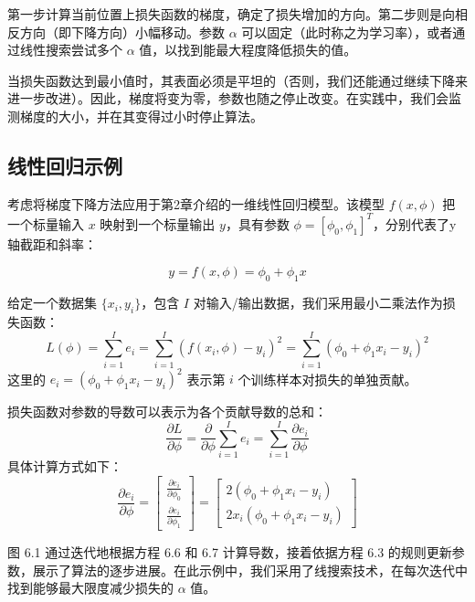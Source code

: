 第一步计算当前位置上损失函数的梯度，确定了损失增加的方向。第二步则是向相反方向（即下降方向）小幅移动。参数 \(\alpha\) 可以固定（此时称之为学习率），或者通过线性搜索尝试多个 \(\alpha\) 值，以找到能最大程度降低损失的值。

当损失函数达到最小值时，其表面必须是平坦的（否则，我们还能通过继续下降来进一步改进）。因此，梯度将变为零，参数也随之停止改变。在实践中，我们会监测梯度的大小，并在其变得过小时停止算法。

\subsection{线性回归示例}

考虑将梯度下降方法应用于第2章介绍的一维线性回归模型。该模型 \(f(x, \phi)\) 把一个标量输入 \(x\) 映射到一个标量输出 \(y\)，具有参数 \(\phi = [\phi_0, \phi_1]^T\)，分别代表了y轴截距和斜率：

\begin{equation}
y = f(x, \phi) = \phi_0 + \phi_1x 
\end{equation}

给定一个数据集 \(\{x_i, y_i\}\)，包含 \(I\) 对输入/输出数据，我们采用最小二乘法作为损失函数：
\begin{equation}
L(\phi) = \sum_{i=1}^I e_i = \sum_{i=1}^I (f(x_i, \phi) - y_i)^2 = \sum_{i=1}^I (\phi_0 + \phi_1x_i - y_i)^2 
\end{equation}
这里的 \(e_i = (\phi_0 + \phi_1x_i - y_i)^2\) 表示第 \(i\) 个训练样本对损失的单独贡献。

损失函数对参数的导数可以表示为各个贡献导数的总和：
\begin{equation}
\frac{\partial L}{\partial \phi} = \frac{\partial}{\partial \phi} \sum_{i=1}^I e_i = \sum_{i=1}^I \frac{\partial e_i}{\partial \phi} 
\end{equation}
具体计算方式如下：
\begin{equation}
\frac{\partial e_i}{\partial \phi} = 
\begin{bmatrix}
\frac{\partial e_i}{\partial \phi_0}  \\
\frac{\partial e_i}{\partial \phi_1} 
\end{bmatrix} =
\begin{bmatrix}
2(\phi_0 + \phi_1x_i - y_i)  \\
2x_i(\phi_0 + \phi_1x_i - y_i)  
\end{bmatrix} 
\end{equation}

图 6.1 通过迭代地根据方程 6.6 和 6.7 计算导数，接着依据方程 6.3 的规则更新参数，展示了算法的逐步进展。在此示例中，我们采用了线搜索技术，在每次迭代中找到能够最大限度减少损失的 \(\alpha\) 值。



